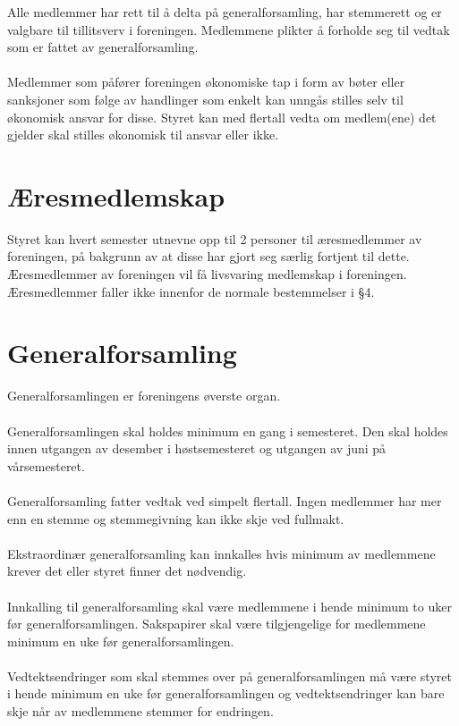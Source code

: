 \documentclass[12pt,a4paper,norsk]{article}
\begin{document}
Alle medlemmer har rett til å delta på generalforsamling, har stemmerett og er valgbare til tillitsverv i foreningen. Medlemmene plikter å forholde seg til vedtak som er fattet av generalforsamling.
\\
\\
Medlemmer som påfører foreningen økonomiske tap i form av bøter eller sanksjoner som følge av handlinger som enkelt kan unngås stilles selv til økonomisk ansvar for disse. Styret kan med  flertall vedta om medlem(ene) det gjelder skal stilles økonomisk til ansvar eller ikke.



\section{Æresmedlemskap}

Styret kan hvert semester utnevne opp til 2 personer til æresmedlemmer av foreningen, på bakgrunn av at disse har gjort seg særlig fortjent til dette. Æresmedlemmer av foreningen vil få livsvaring medlemskap i foreningen. Æresmedlemmer faller ikke innenfor de normale bestemmelser i §4.



\section{Generalforsamling}

Generalforsamlingen er foreningens øverste organ.
\\
\\
Generalforsamlingen skal holdes minimum en gang i semesteret. Den skal holdes innen utgangen av desember i høstsemesteret og utgangen av juni på vårsemesteret.
\\
\\
Generalforsamling fatter vedtak ved simpelt flertall. Ingen medlemmer har mer enn en stemme og stemmegivning kan ikke skje ved fullmakt.
\\
\\
Ekstraordinær generalforsamling kan innkalles hvis minimum  av medlemmene krever det eller styret finner det nødvendig.
\\
\\
Innkalling til generalforsamling skal være medlemmene i hende minimum to uker før generalforsamlingen. Sakspapirer skal være tilgjengelige for medlemmene minimum en uke før generalforsamlingen.
\\
\\
Vedtektsendringer som skal stemmes over på generalforsamlingen må være styret i hende minimum en uke før generalforsamlingen og vedtektsendringer kan bare skje når  av medlemmene stemmer for endringen.
\end{document}
